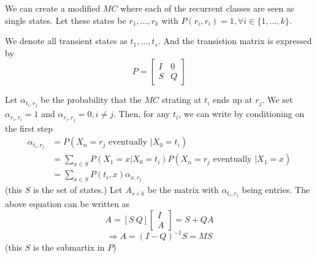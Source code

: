 \documentclass[11pt,a4paper]{article}
\begin{document}
We can create a modified $MC$ where each of the recurrent classes are seen as single states. Let these states be $r_1,...,r_k$ with $P (r_i, r_i) = 1,\forall i\in\{1,...,k\}$.

We denote all transient states as $t_1,...,t_s$. And the transistion matrix is expressed by $$P=\begin{bmatrix}
    I&0\\
    S&Q
\end{bmatrix}$$

Let $\alpha_{t_i,r_j}$ be the probability that the $MC$ strating at $t_i$ ends up at $r_j$. We set $\alpha_{r_i,r_i}=1$ and $\alpha_{r_i,r_j}=0,i\neq j$. Then, for any $t_i$, we can write by conditioning on the first step
\begin{equation}
    \begin{aligned}
        \alpha_{t_i,r_j}&=P(X_n=r_j\text{ eventually }|X_0=t_i)\\
        &=\sum_{x\in S}P(X_1=x|X_0=t_i)P(X_n=r_j\text{ eventually }|X_1=x)\\
        &=\sum_{x\in S}P(t_i,x)\alpha_{x,r_j}
    \end{aligned}
    \nonumber
\end{equation}
(this $S$ is the set of states.)
Let $A_{s\times k}$ be the matrix with $\alpha_{t_i,r_j}$ being entries. The above equation can be written as $$A=\left[S\ Q\right]\begin{bmatrix}
    I\\
    A
\end{bmatrix}=S+QA$$
$$\Rightarrow A=(I-Q)^{-1}S=MS$$
(this $S$ is the submartix in $P$)
\end{document}
